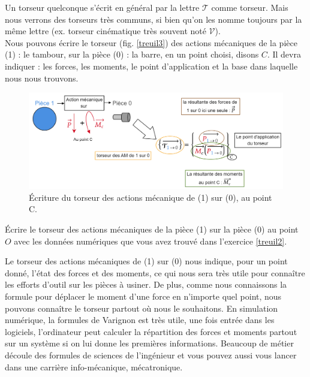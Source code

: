\documentclass[
	11pt, %
	fleqn, %
	a4paper, %
]{LegrandOrangeBook}
\begin{document}
Un torseur quelconque s'écrit en général par la lettre $\mathcal{T}$ comme torseur. Mais nous verrons des torseurs très communs, si bien qu'on les nomme toujours par la même lettre (ex. torseur cinématique très souvent noté $\mathcal{V}$).\\

Nous pouvons écrire le torseur (fig. \ref{treuil3}) des actions mécaniques de la pièce (1) : le tambour, sur la pièce (0) : la barre, en un point choisi, disons $C$. Il devra indiquer : les forces, les moments, le point d'application et la base dans laquelle nous nous trouvons. 

\begin{figure}[H]  %
	\centering %
	\includegraphics[width=1.15\textwidth]{Images/treuil4.png} %
    \caption{Écriture du torseur des actions mécanique de (1) sur (0), au point C.}
	\label{treuil4} %
\end{figure}

\begin{Exercice}
    Écrire le torseur des actions mécaniques de la pièce (1) sur la pièce (0) au point $O$ avec les données numériques que vous avez trouvé dans l'exercice \ref{treuil2}.
\end{Exercice}


Le torseur des actions mécaniques de (1) sur (0) nous indique, pour un point donné, l'état des forces et des moments, ce qui nous sera très utile pour connaître les efforts d'outil sur les pièces à usiner. De plus, comme nous connaissons la formule pour déplacer le moment d'une force en n'importe quel point, nous pouvons connaître le torseur partout où nous le souhaitons. En simulation numérique, la formules de Varignon est très utile, une fois entrée dans les logiciels, l'ordinateur peut calculer la répartition des forces et moments partout sur un système si on lui donne les premières informations. Beaucoup de métier découle des formules de sciences de l'ingénieur et vous pouvez aussi vous lancer dans une carrière info-mécanique, mécatronique.\\
\end{document}
